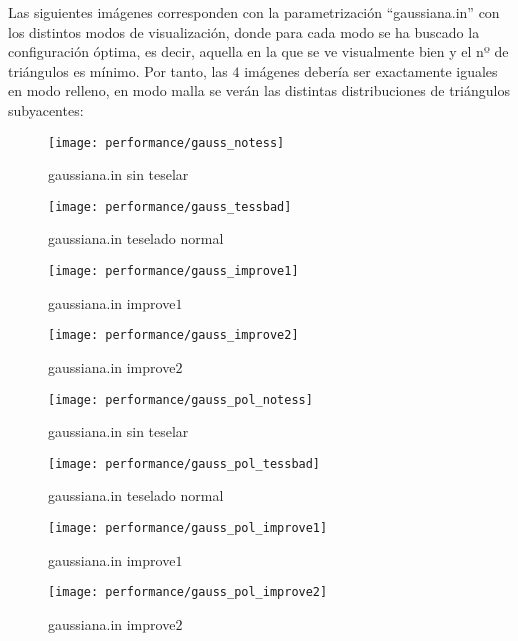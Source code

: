 	
	\newpage
	Las siguientes imágenes corresponden con la parametrización ``gaussiana.in'' con los distintos modos de visualización, donde para cada modo se ha buscado la configuración óptima, es decir, aquella en la que se ve visualmente bien y el nº de triángulos es mínimo. Por tanto, las $4$ imágenes debería ser exactamente iguales en modo relleno, en modo malla se verán las distintas distribuciones de triángulos subyacentes:
	\begin{figure}[h]
		\begin{minipage}{0.48\textwidth}
  			\centering
  			\texttt{[image: performance/gauss\_notess]}
  			\caption{gaussiana.in sin teselar}
		\end{minipage}\hfill
		\begin{minipage}{0.48\textwidth}
  			\centering
  			\texttt{[image: performance/gauss\_tessbad]}
  			\caption{gaussiana.in teselado normal}
		\end{minipage}\hfill
		
		\begin{minipage}{0.48\textwidth}
  			\centering
  			\texttt{[image: performance/gauss\_improve1]}
  			\caption{gaussiana.in improve$1$}
		\end{minipage}\hfill
		\begin{minipage}{0.48\textwidth}
  			\centering
  			\texttt{[image: performance/gauss\_improve2]}
  			\caption{gaussiana.in improve$2$}
		\end{minipage}\hfill
  		\label{fig:imagenes_gauss}
	\end{figure}	
	
	\newpage
	\begin{figure}[h]
		\begin{minipage}{0.48\textwidth}
  			\centering
  			\texttt{[image: performance/gauss\_pol\_notess]}
  			\caption{gaussiana.in sin teselar}
		\end{minipage}\hfill
		\begin{minipage}{0.48\textwidth}
  			\centering
  			\texttt{[image: performance/gauss\_pol\_tessbad]}
  			\caption{gaussiana.in teselado normal}
		\end{minipage}\hfill
		
		\begin{minipage}{0.48\textwidth}
  			\centering
  			\texttt{[image: performance/gauss\_pol\_improve1]}
  			\caption{gaussiana.in improve$1$}
		\end{minipage}\hfill
		\begin{minipage}{0.48\textwidth}
  			\centering
  			\texttt{[image: performance/gauss\_pol\_improve2]}
  			\caption{gaussiana.in improve$2$}
		\end{minipage}\hfill
  		\label{fig:imagenes_gauss_pol}
	\end{figure}	
	
